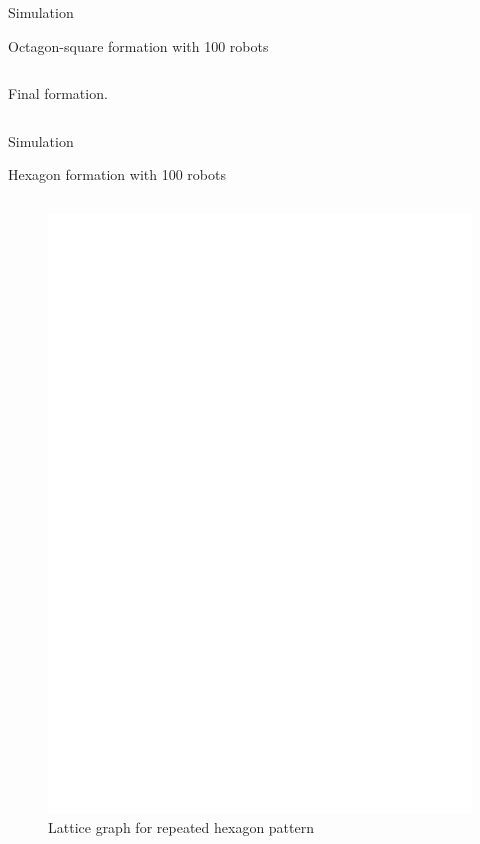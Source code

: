\documentclass[10pt]{beamer}
\begin{document}
\begin{frame}{Simulation}
\begin{block}{Octagon-square formation with 100 robots}
\begin{columns}[T]
\begin{column}{.5\textwidth}
\begin{figure}
        \end{figure}
        \begin{center}
          Final formation.
        \end{center}
      \end{column}%
    \end{columns}
  \end{block}
\end{frame}
\begin{frame}{Simulation}{}
  \begin{block}{Hexagon formation with 100 robots}
    \begin{columns}[T] %
      \begin{column}{.5\textwidth}
        \begin{figure}
          \centering
          \includegraphics[scale=0.5]{figs/hex}
          \caption{Lattice graph for repeated hexagon pattern}

\end{figure}
\end{column}
\end{columns}
\end{block}
\end{frame}
\end{document}
